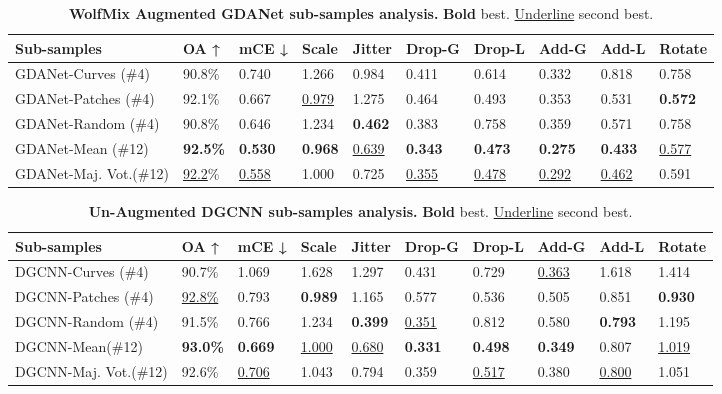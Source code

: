 \documentclass[10pt,twocolumn]{article}
\begin{document}
\begin{table*}
  \centering
    \begin{tabular}{p{4cm} || p{1.1cm} p{1.1cm} p{1.1cm} p{1.1cm} p{1.2cm} p{1.2cm} p{1.1cm} p{1.1cm} p{1.1cm}}
    \hline
    Sub-samples & OA ↑ & mCE ↓ & Scale & Jitter & Drop-G & Drop-L & Add-G & Add-L & Rotate \\
    \hline
    GDANet-Curves (\#4) & 90.8\% & 0.740 & 1.266 & 0.984 & 0.411 & 0.614 & 0.332 & 0.818 & 0.758\\
    GDANet-Patches (\#4) & 92.1\% & 0.667 & \underline{0.979} & 1.275 & 0.464 & 0.493 & 0.353 & 0.531 & \textbf{0.572}\\
    GDANet-Random (\#4) & 90.8\% & 0.646 & 1.234 & \textbf{0.462} & 0.383 & 0.758 & 0.359 & 0.571 & 0.758\\
    \hline
    GDANet-Mean (\#12) & \textbf{92.5\%} & \textbf{0.530} & \textbf{0.968} & \underline{0.639} & \textbf{0.343} &  \textbf{0.473} & \textbf{0.275} & \textbf{0.433} &  \underline{0.577}\\
    GDANet-Maj. Vot.(\#12) & \underline{92.2}\% & \underline{0.558} & 1.000 & 0.725 & \underline{0.355} &  \underline{0.478} & \underline{0.292} & \underline{0.462} &  0.591\\
    
    \hline
  \end{tabular}
  \caption{{\bf WolfMix Augmented GDANet sub-samples analysis.} {\bf Bold} best. \underline{Underline} second best.}
  \label{table:gdanet_augmented_sub_samples}
\end{table*}

\begin{table*}
  \centering
    \begin{tabular}{p{4cm} || p{1.1cm} p{1.1cm} p{1.1cm} p{1.1cm} p{1.2cm} p{1.2cm} p{1.1cm} p{1.1cm} p{1.1cm}}
    \hline
    Sub-samples & OA ↑ & mCE ↓ & Scale & Jitter & Drop-G & Drop-L & Add-G & Add-L & Rotate \\
    \hline
    DGCNN-Curves (\#4) & 90.7\% & 1.069 & 1.628 & 1.297 & 0.431 & 0.729 & \underline{0.363} & 1.618 & 1.414\\
    DGCNN-Patches (\#4) & \underline{92.8\%} & 0.793 & \textbf{0.989} & 1.165 & 0.577 & 0.536 & 0.505 & 0.851 & \textbf{0.930}\\
    DGCNN-Random (\#4) & 91.5\% & 0.766 & 1.234 & \textbf{0.399} & \underline{0.351} & 0.812 & 0.580 & \textbf{0.793} & 1.195\\
    \hline
    DGCNN-Mean(\#12) & \textbf{93.0\%} & \textbf{0.669} & \underline{1.000} &  \underline{0.680} & \textbf{0.331} &  \textbf{0.498} & \textbf{0.349} & 0.807 &  \underline{1.019}\\
    DGCNN-Maj. Vot.(\#12) & 92.6\% & \underline{0.706} & 1.043 &  0.794 & 0.359 &  \underline{0.517} & 0.380 & \underline{0.800} &  1.051\\
    
    \hline
  \end{tabular}
  \caption{{\bf Un-Augmented DGCNN sub-samples analysis.} {\bf Bold} best. \underline{Underline} second best.}
  \label{table:dgcnn_unaugmented_sub_samples}
\end{table*}
\end{document}
